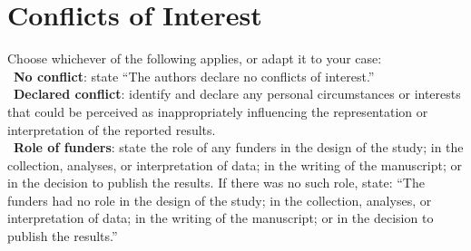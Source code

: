 \documentclass[lettersize,journal]{IEEEtran}
\begin{document}
\section*{Conflicts of Interest}
Choose whichever of the following applies, or adapt it to your
case: \\
\textbullet\ \textbf{No conflict}: state ``The authors declare no
conflicts of interest.'' \\
\textbullet\ \textbf{Declared conflict}: identify and declare any
personal circumstances or interests that could be perceived as
inappropriately influencing the representation or interpretation of
the reported results. \\
\textbullet\ \textbf{Role of funders}: state the role of any funders
in the design of the study; in the collection, analyses, or
interpretation of data; in the writing of the manuscript; or in the
decision to publish the results. If there was no such role, state:
``The funders had no role in the design of the study; in the
collection, analyses, or interpretation of data; in the writing of the
manuscript; or in the decision to publish the results.''

\balance





%
\end{document}
